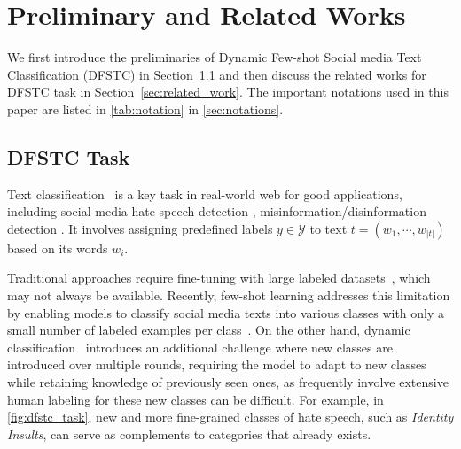 
 \section{Preliminary and Related Works}\label{sec:pre_rel}

	We first introduce the preliminaries of Dynamic Few-shot Social media Text Classification (DFSTC) in Section~\ref{sec:dfstc} and then discuss the
		related works for DFSTC task
 in Section~\ref{sec:related_work}. 
	The important notations used in this paper are listed in \autoref{tab:notation} in \autoref{sec:notations}.
	








\subsection{DFSTC Task} \label{sec:dfstc}
Text classification~\cite{kowsari2019text, minaee2021deep, li2022survey} is a key task in real-world web for good applications, including social media hate speech detection \cite{geissler2025analyzing,hee2024brinjal,chen2024hate,djuric2015hate,subramanyam2024triage,mandal2024contrastive,cao2024modularized,ji2024capalign,guo2024bayesian},
misinformation/disinformation detection 
\cite{luo2024message,nesterov2024contentious,liu2025modality,toughrai2025fake,cinus2025exposing,ashkinaze2024dynamics,chen2022cross,shang2024mmadapt,ye2024susceptibility}.
It involves assigning predefined labels $y \in \mathcal{Y}$
to text $t=(w_1,\cdots,w_{|t|})$ based on its words $w_i$. 


Traditional approaches require fine-tuning with large labeled datasets~\cite{devlin2018bert,liu2019roberta}, which may not always be available.
Recently, few-shot learning addresses this limitation by enabling models to classify social media texts into various classes with only a small number of labeled examples per class~\cite{meng2018weakly,meng2020text}.
On the other hand, dynamic classification~\cite{parisi2019continual, hanmo2024effective, wang2024comprehensive} introduces an additional challenge where new classes are introduced over multiple rounds, requiring the model to adapt to new classes while retaining knowledge of previously seen ones, as frequently involve extensive human labeling for these new classes can be difficult. 
	For example, in \autoref{fig:dfstc_task}, new and more fine-grained classes of hate speech, such as \textit{Identity Insults}, can serve as complements to categories that already exists. 

